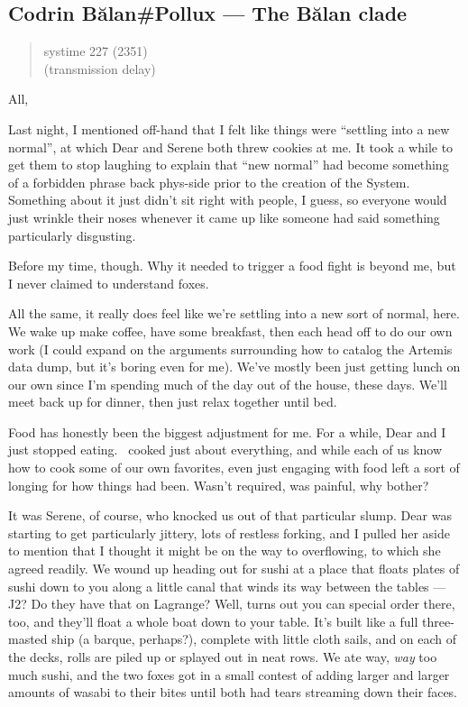 \hypertarget{codrin-bux103lanpollux-the-bux103lan-clade}{%
\subsection{Codrin Bălan\#Pollux — The Bălan clade}\label{codrin-bux103lanpollux-the-bux103lan-clade}}

\begin{quote}
systime 227 (2351)\\
(transmission delay)
\end{quote}

All,

Last night, I mentioned off-hand that I felt like things were ``settling into a new normal'', at which Dear and Serene both threw cookies at me. It took a while to get them to stop laughing to explain that ``new normal'' had become something of a forbidden phrase back phys-side prior to the creation of the System. Something about it just didn't sit right with people, I guess, so everyone would just wrinkle their noses whenever it came up like someone had said something particularly disgusting.

Before my time, though. Why it needed to trigger a food fight is beyond me, but I never claimed to understand foxes.

All the same, it really does feel like we're settling into a new sort of normal, here. We wake up make coffee, have some breakfast, then each head off to do our own work (I could expand on the arguments surrounding how to catalog the Artemis data dump, but it's boring even for me). We've mostly been just getting lunch on our own since I'm spending much of the day out of the house, these days. We'll meet back up for dinner, then just relax together until bed.

Food has honestly been the biggest adjustment for me. For a while, Dear and I just stopped eating. \Partner\ cooked just about everything, and while each of us know how to cook some of our own favorites, even just engaging with food left a sort of longing for how things had been. Wasn't required, was painful, why bother?

It was Serene, of course, who knocked us out of that particular slump. Dear was starting to get particularly jittery, lots of restless forking, and I pulled her aside to mention that I thought it might be on the way to overflowing, to which she agreed readily. We wound up heading out for sushi at a place that floats plates of sushi down to you along a little canal that winds its way between the tables — J2? Do they have that on Lagrange? Well, turns out you can special order there, too, and they'll float a whole boat down to your table. It's built like a full three-masted ship (a barque, perhaps?), complete with little cloth sails, and on each of the decks, rolls are piled up or splayed out in neat rows. We ate way, \emph{way} too much sushi, and the two foxes got in a small contest of adding larger and larger amounts of wasabi to their bites until both had tears streaming down their faces.

